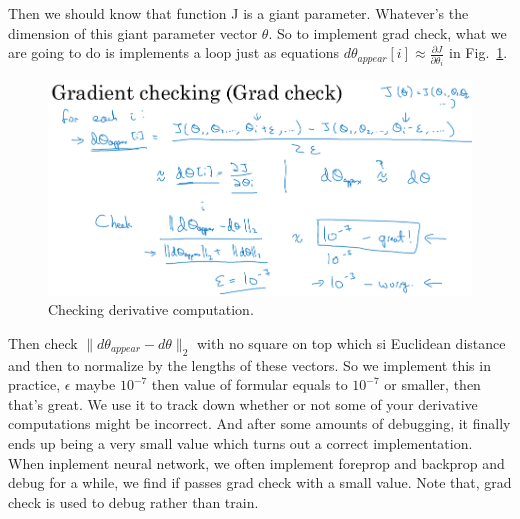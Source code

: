 \documentclass[a4paper]{article}
\begin{document}
Then we should know that function J is a giant parameter. Whatever's the dimension of this giant parameter vector $\theta$. So to implement grad check, what we are going to do is implements a loop just as equations $d\theta_{appear}[i]\approx \frac{\partial J}{\partial \theta_i}$ in Fig.~\ref{p15}.  
\begin{figure}
	\begin{center}
		\includegraphics[scale=0.3]{figures/16.png}
	\end{center}
	\caption{Checking derivative computation.}
	\label{p15}
\end{figure}
Then check $\parallel d\theta_{appear}-d\theta \parallel_2$ with no square on top which si Euclidean distance and then to normalize by the lengths of these vectors. So we implement this in practice, $\epsilon$ maybe $10^{-7}$ then value of formular equals to $10^{-7}$ or smaller, then that's great. We use it to track down whether or not some of your derivative computations might be incorrect. And after some amounts of debugging, it finally ends up being a very small value which turns out a correct implementation. When inplement neural network, we often implement foreprop and backprop and debug for a while, we find if passes grad check with a small value. Note that, grad check is used to debug rather than train.
\end{document}

